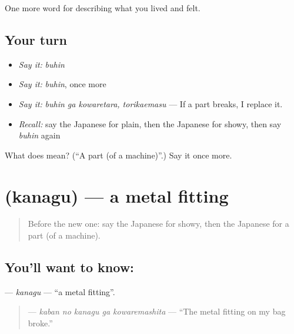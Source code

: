 \begin{grammarlens}[title={What you've built}]
One more word for describing what you lived and felt.
\end{grammarlens}

\subsection*{Your turn}
\begin{itemize}
\raggedright
  \item \emph{Say it:} \emph{buhin}
  \item \emph{Say it:} \emph{buhin}, once more
  \item \emph{Say it:} \emph{buhin ga kowaretara, torikaemasu} — If a part breaks, I replace it.
  \item \emph{Recall:} say the Japanese for plain, then the Japanese for showy, then say \emph{buhin} again
\end{itemize}

\begin{tcolorbox}[breakable,colback=teal!4,colframe=teal!35!black,title={Before you move on}]
What does  mean? (\textquotedblleft{}A part (of a machine)\textquotedblright{}.) Say it once more.
\end{tcolorbox}
\section[\texorpdfstring{\ja{かなぐ} (kanagu)}{かなぐ (kanagu)}]{ (kanagu) — a metal fitting}

\label{lesson:JA-C486-kanagu}



\begin{quote}
Before the new one: say the Japanese for showy, then the Japanese for a part (of a machine).
\end{quote}

\subsection*{You'll want to know: }
\textbf{} — \emph{kanagu} — \textquotedblleft{}a metal fitting\textquotedblright{}.

\begin{quote}
\textbf{  } — \emph{kaban no kanagu ga kowaremashita} — \textquotedblleft{}The metal fitting on my bag broke.\textquotedblright{}
\end{quote}


